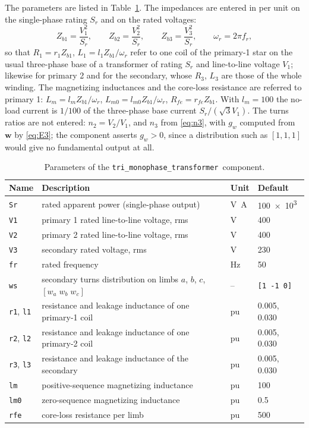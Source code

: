 \documentclass[10pt,a4paper]{scrartcl}
\newcommand{\vect}[1]{\boldsymbol{#1}}
\newcommand{\sscname}{\texttt{tri\_monophase\_transformer}}
\begin{document}
\begin{onehalfspace}
The parameters are listed in Table~\ref{tab:par}. The impedances are entered in per unit on the single-phase rating $S_r$ and on the rated voltages:
\begin{equation}
Z_{b1} = \frac{V_1^2}{S_r}, \qquad Z_{b2} = \frac{V_2^2}{S_r}, \qquad Z_{b3} = \frac{V_3^2}{S_r}, \qquad \omega_r = 2\pi f_r ,
\end{equation}
so that $R_1 = r_1 Z_{b1}$, $L_1 = l_1 Z_{b1}/\omega_r$ refer to one coil of the primary-1 star on the usual three-phase base of a transformer of rating $S_r$ and line-to-line voltage $V_1$; likewise for primary 2 and for the secondary, whose $R_3$, $L_3$ are those of the whole winding. The magnetizing inductances and the core-loss resistance are referred to primary 1: $L_m = l_m Z_{b1}/\omega_r$, $L_{m0} = l_{m0} Z_{b1}/\omega_r$, $R_{fe} = r_{fe} Z_{b1}$. With $l_m = 100$ the no-load current is $1/100$ of the three-phase base current $S_r/(\sqrt3 V_1)$. The turns ratios are not entered: $n_2 = V_2/V_1$, and $n_3$ from \eqref{eq:n3}, with $g_w$ computed from $\vect{w}$ by \eqref{eq:E3}; the component asserts $g_w>0$, since a distribution such as $[1,1,1]$ would give no fundamental output at all.

\begin{table}[htbp]
\centering
\caption{Parameters of the \sscname\ component.}
\label{tab:par}
\small
\begin{tabular}{llll}
\toprule
Name & Description & Unit & Default \\
\midrule
\texttt{Sr}  & rated apparent power (single-phase output) & \si{\volt\ampere} & \num{100e3} \\
\texttt{V1}  & primary 1 rated line-to-line voltage, rms & \si{\volt} & 400 \\
\texttt{V2}  & primary 2 rated line-to-line voltage, rms & \si{\volt} & 400 \\
\texttt{V3}  & secondary rated voltage, rms & \si{\volt} & 230 \\
\texttt{fr}  & rated frequency & \si{\hertz} & 50 \\
\texttt{ws}  & secondary turns distribution on limbs $a$, $b$, $c$, $[w_a\;w_b\;w_c]$ & -- & \texttt{[1 -1 0]} \\
\texttt{r1}, \texttt{l1} & resistance and leakage inductance of one primary-1 coil & pu & 0.005, 0.030 \\
\texttt{r2}, \texttt{l2} & resistance and leakage inductance of one primary-2 coil & pu & 0.005, 0.030 \\
\texttt{r3}, \texttt{l3} & resistance and leakage inductance of the secondary & pu & 0.005, 0.030 \\
\texttt{lm}  & positive-sequence magnetizing inductance & pu & 100 \\
\texttt{lm0} & zero-sequence magnetizing inductance & pu & 0.5 \\
\texttt{rfe} & core-loss resistance per limb & pu & 500 \\
\bottomrule
\end{tabular}
\end{table}


\end{onehalfspace}
\end{document}
